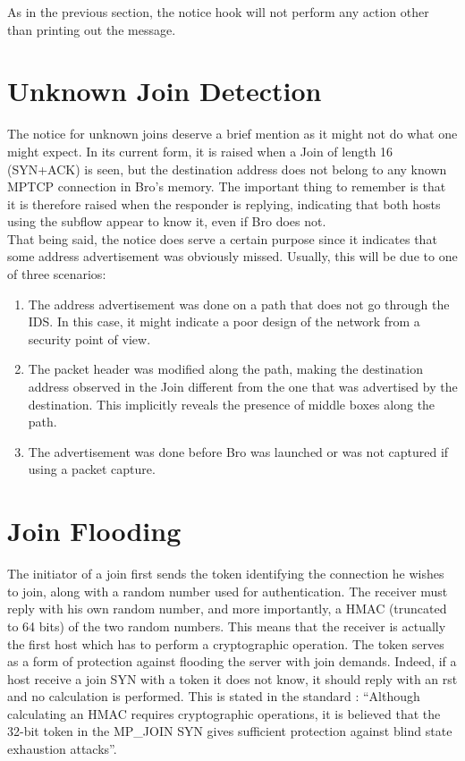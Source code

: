 As in the previous section, the notice hook will not perform any action other than printing out the message.

\section{Unknown Join Detection}
The notice for unknown joins deserve a brief mention as it might not do what one might expect. In its current form, it is raised when a Join of length 16 (SYN+ACK) is seen, but the destination address does not belong to any known MPTCP connection in Bro's memory. The important thing to remember is that it is therefore raised when the responder is replying, indicating that both hosts using the subflow appear to know it, even if Bro does not. \\

That being said, the notice does serve a certain purpose since it indicates that some address advertisement was obviously missed. Usually, this will be due to one of three scenarios: \\

\begin{enumerate}
\item The address advertisement was done on a path that does not go through the IDS. In this case, it might indicate a poor design of the network from a security point of view.
\item The packet header was modified along the path, making the destination address observed in the Join different from the one that was advertised by the destination. This implicitly reveals the presence of middle boxes along the path.
\item The advertisement was done before Bro was launched or was not captured if using a packet capture.
\end{enumerate}


\section{Join Flooding}
The initiator of a join first sends the token identifying the connection he wishes to join, along with a random number used for authentication. The receiver must reply with his own random number, and more importantly, a HMAC (truncated to 64 bits) of the two random numbers. This means that the receiver is actually the first host which has to perform a cryptographic operation. The token serves as a form of protection against flooding the server with join demands. Indeed, if a host receive a join SYN with a token it does not know, it should reply with an rst and no calculation is performed. This is stated in the standard \cite{rfc6824}: ``Although calculating an HMAC requires cryptographic operations, it is believed that the 32-bit token in the MP\_JOIN SYN gives sufficient protection against blind state exhaustion attacks''.\\

